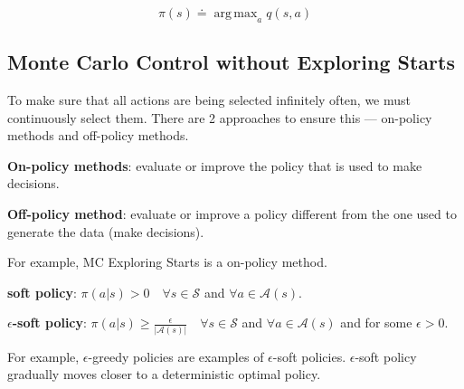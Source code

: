 \documentclass[lang=en,mode=geye,device=normal,color=blue,14pt]{elegantnote}
\DeclareMathOperator*{\1}{\mathbbm{1}}
\DeclareMathOperator*{\argmax}{arg\,max}
\begin{document}
$$ \pi(s) \doteq \argmax_a q(s,a) $$

\subsection{Monte Carlo Control without Exploring Starts}

To make sure that all actions are being selected infinitely often, we must continuously select them.
There are 2 approaches to ensure this — on-policy methods and off-policy methods.

\begin{definition}
\textbf{On-policy methods}: evaluate or improve the policy that is used to make decisions.
\end{definition}
\begin{definition}
\textbf{Off-policy method}: evaluate or improve a policy different from the one used to generate the data (make decisions).
\end{definition}


For example, MC Exploring Starts is a on-policy method.

\begin{definition}
\textbf{soft policy}: $\pi(a|s) > 0\quad \forall s \in \mathcal{S}$ and $\forall a \in \mathcal{A}(s).$
\end{definition}

\begin{definition}
\textbf{$\epsilon$-soft policy}: $\pi(a|s) \geq \frac{\epsilon}{|\mathcal{A}(s)|} \quad \forall s \in \mathcal{S}$ and $\forall a \in \mathcal{A}(s)$ and for some $\epsilon > 0$.
\end{definition}

For example, $\epsilon$-greedy policies are examples of $\epsilon$-soft policies. 
$\epsilon$-soft policy gradually moves closer to a deterministic optimal policy.
\end{document}
